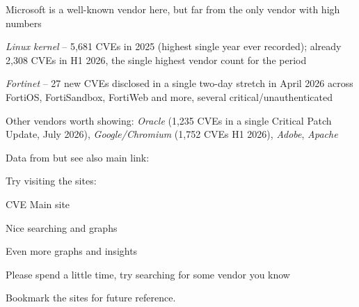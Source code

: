 \documentclass[Screen16to9,17pt]{foils}
\begin{document}
\begin{list2}
\item Microsoft is a well-known vendor here, but far from the only vendor with high numbers
\item \emph{Linux kernel} -- 5{,}681 CVEs in 2025 (highest single year ever recorded); already 2{,}308 CVEs in H1 2026, the single highest vendor count for the period\\
\item \emph{Fortinet} -- 27 new CVEs disclosed in a single two-day stretch in April 2026 across FortiOS, FortiSandbox, FortiWeb and more, several critical/unauthenticated\\
\item Other vendors worth showing: \emph{Oracle} (1{,}235 CVEs in a single Critical Patch Update, July 2026), \emph{Google/Chromium} (1{,}752 CVEs H1 2026), \emph{Adobe}, \emph{Apache}
\end{list2}



Data from  but see also main link: 


Try visiting the sites:
\begin{list2}
\item CVE Main site 
\item Nice searching and graphs 
\item Even more graphs and insights 
\end{list2}

Please spend a little time, try searching for some vendor you know

Bookmark the sites for future reference.



\end{document}
